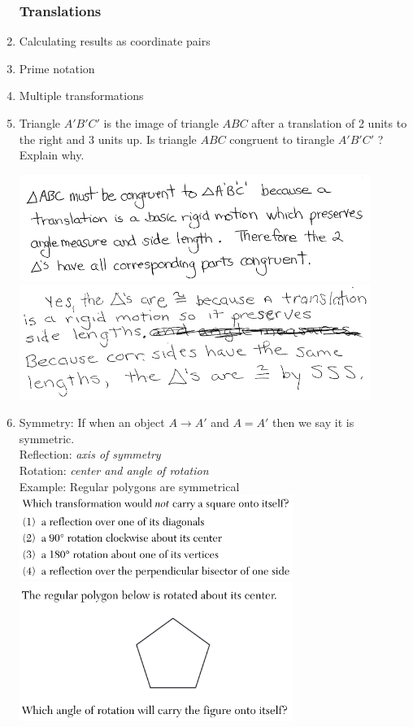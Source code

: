 \documentclass[12pt, twoside]{article}
\begin{document}
  \begin{enumerate}
    \subsubsection*{Translations}
    \item Calculating results as coordinate pairs
    \item Prime notation
    \item Multiple transformations

    \item Triangle $A'B'C'$ is the image of triangle $ABC$ after a translation of 2 units to the right and 3 units up. Is triangle $ABC$ congruent to tirangle $A'B'C'$ ? Explain why.

    \includegraphics[width=0.9\textwidth]{Isometry_JN2018-25-sol.png}\\
    \includegraphics[width=0.9\textwidth]{Isometry_JN2018-25-sol2.png}

    \item Symmetry: If when an object $A \rightarrow A'$ and $A = A'$ then we say it is symmetric. \\
    Reflection: \emph{axis of symmetry}\\
    Rotation: \emph{center and angle of rotation}\\[0.25cm]
    Example: Regular polygons are symmetrical\\[0.25cm]

    \includegraphics[width=0.7\textwidth]{symmetry-square_JA2018-15.png}\\[0.5cm]
    \includegraphics[width=0.7\textwidth]{symmetry_JN2018-19.png}


\end{enumerate}
\end{document}
